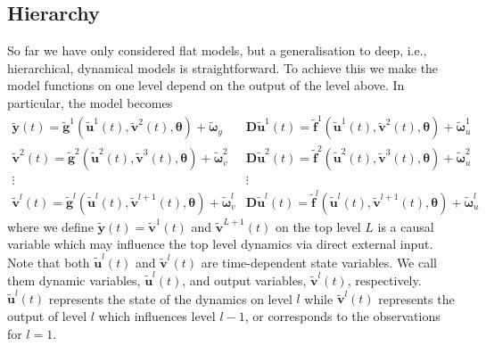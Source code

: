 \documentclass[a4paper,10pt]{article}
\newcommand{\bs}[1]{\mathbf{#1}}					%
\newcommand{\bgs}[1]{\boldsymbol{#1}}				%
\newcommand{\eq}[1]{\begin{equation} #1 \end{equation}}%
\newcommand{\gc}[1]{\tilde{#1}} %
\renewcommand{\ss}{u}         %
\newcommand{\sv}{v}         %
\newcommand{\so}{y}         %
\renewcommand{\sp}{\theta}    %
\newcommand{\ps}{\bs{\ss}}    %
\newcommand{\pv}{\bs{\sv}}    %
\newcommand{\po}{\bs{\so}}    %
\newcommand{\psg}{\gc{\ps}}    %
\newcommand{\pvg}{\gc{\pv}}    %
\newcommand{\pog}{\gc{\po}}    %
\newcommand{\pp}{\bgs{\sp}} %
\newcommand{\D}{\bs{D}}				%
\begin{document}
\subsection{Hierarchy}
So far we have only considered flat models, but a generalisation to deep, i.e., hierarchical, dynamical models is straightforward. To achieve this we make the model functions on one level depend on the output of the level above. In particular, the model becomes
\eq{\begin{array}{cc}
    \pog(t) = \gc{\bs{g}}^1(\psg^1(t),\pvg^2(t),\pp) + \gc{\bgs{\omega}}_\so & \D\psg^1(t) = \gc{\bs{f}}^1(\psg^1(t),\pvg^2(t),\pp)+\gc{\bgs{\omega}}_{\ss}^1\\
    \pvg^2(t) = \gc{\bs{g}}^2(\psg^2(t),\pvg^3(t),\pp) + \gc{\bgs{\omega}}_\sv^2 & \D\psg^2(t) = \gc{\bs{f}}^2(\psg^2(t),\pvg^3(t),\pp)+\gc{\bgs{\omega}}_{\ss}^2\\
    \vdots & \vdots\\
    \pvg^{l}(t) = \gc{\bs{g}}^l(\psg^l(t),\pvg^{l+1}(t),\pp) + \gc{\bgs{\omega}}_\sv^l & \D\psg^l(t) = \gc{\bs{f}}^l(\psg^l(t),\pvg^{l+1}(t),\pp)+\gc{\bgs{\omega}}_{\ss}^l
\end{array}
}
where we define $\pog(t) = \pvg^{1}(t)$ and $\pvg^{L+1}(t)$ on the top level $L$ is a causal variable which may influence the top level dynamics via direct external input. Note that both $\psg^{l}(t)$ and $\pvg^{l}(t)$ are time-dependent state variables. We call them dynamic variables, $\psg^l(t)$, and output variables, $\pvg^l(t)$, respectively. $\psg^l(t)$ represents the state of the dynamics on level $l$ while $\pvg^l(t)$ represents the output of level $l$ which influences level $l-1$, or corresponds to the observations for $l=1$. 
\end{document}

